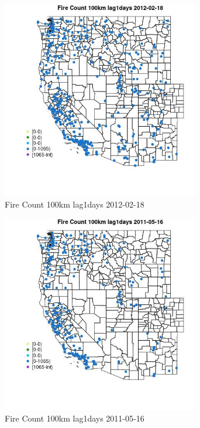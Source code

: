 \begin{figure} 
\centering  
\includegraphics[width=0.77\textwidth]{Code_Outputs/Report_ML_input_PM25_Step4_part_f_de_duplicated_aves_prioritize_24hr_obswNAs_MapObsFire_Count_100km_lag1days2012-02-18.jpg} 
\caption{\label{fig:Report_ML_input_PM25_Step4_part_f_de_duplicated_aves_prioritize_24hr_obswNAsMapObsFire_Count_100km_lag1days2012-02-18}Fire Count 100km lag1days 2012-02-18} 
\end{figure} 
 

\begin{figure} 
\centering  
\includegraphics[width=0.77\textwidth]{Code_Outputs/Report_ML_input_PM25_Step4_part_f_de_duplicated_aves_prioritize_24hr_obswNAs_MapObsFire_Count_100km_lag1days2011-05-16.jpg} 
\caption{\label{fig:Report_ML_input_PM25_Step4_part_f_de_duplicated_aves_prioritize_24hr_obswNAsMapObsFire_Count_100km_lag1days2011-05-16}Fire Count 100km lag1days 2011-05-16} 
\end{figure} 
 

